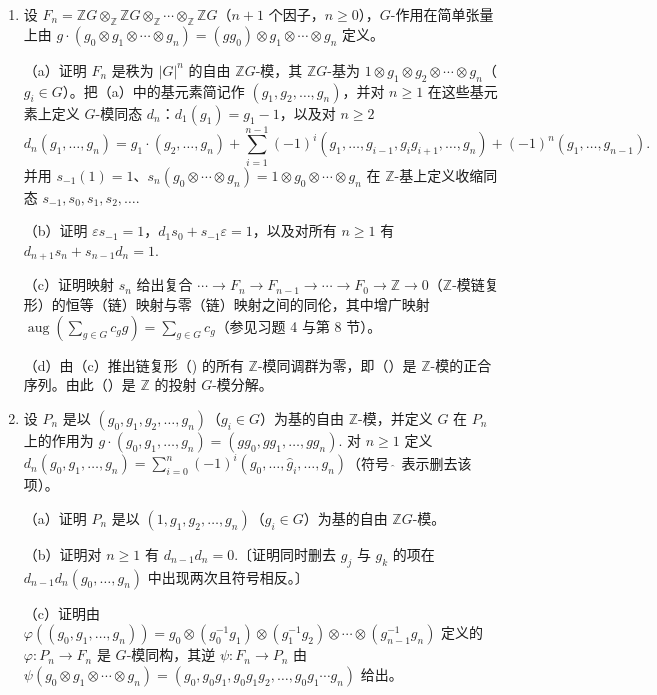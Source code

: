 \begin{enumerate}
\item 设 \(F_n = \mathbb{Z}G \otimes_{\mathbb{Z}}\mathbb{Z}G \otimes_{\mathbb{Z}}\cdots \otimes_{\mathbb{Z}}\mathbb{Z}G\)（\(n+1\) 个因子，\(n \geq 0\)），\(G\)-作用在简单张量上由 \(g \cdot (g_0 \otimes g_1 \otimes \cdots \otimes g_n) = (gg_0) \otimes g_1 \otimes \cdots \otimes g_n\) 定义。

（a）证明 \(F_n\) 是秩为 \(|G|^n\) 的自由 \(\mathbb{Z}G\)-模，其 \(\mathbb{Z}G\)-基为 \(1 \otimes g_1 \otimes g_2 \otimes \cdots \otimes g_n\)（\(g_i \in G\)）。把（a）中的基元素简记作 \((g_1, g_2, \ldots, g_n)\)，并对 \(n \geq 1\) 在这些基元素上定义 \(G\)-模同态 \(d_n\)：\(d_1(g_1) = g_1-1\)，以及对 \(n \geq 2\)
\[
d_n(g_1, \ldots, g_n) = g_1 \cdot (g_2, \ldots, g_n)+\sum_{i=1}^{n-1}(-1)^i(g_1, \ldots, g_{i-1}, g_ig_{i+1}, \ldots, g_n)+(-1)^n(g_1, \ldots, g_{n-1}).
\]
并用 \(s_{-1}(1) = 1\)、\(s_n(g_0 \otimes \cdots \otimes g_n) = 1 \otimes g_0 \otimes \cdots \otimes g_n\) 在 \(\mathbb{Z}\)-基上定义收缩同态 \(s_{-1}, s_0, s_1, s_2, \ldots\).

（b）证明 \(\varepsilon s_{-1} = 1\)，\(d_1s_0+s_{-1}\varepsilon = 1\)，以及对所有 \(n \geq 1\) 有 \(d_{n+1}s_n+s_{n-1}d_n = 1\).

（c）证明映射 \(s_n\) 给出复合 \(\cdots \to F_n \to F_{n-1} \to \cdots \to F_0 \to \mathbb{Z} \to 0\)（\(\mathbb{Z}\)-模链复形）的恒等（链）映射与零（链）映射之间的同伦，其中增广映射 \(\operatorname{aug}(\sum_{g \in G}c_gg) = \sum_{g \in G}c_g\)（参见习题 4 与第 8 节）。

（d）由（c）推出链复形（\*) 的所有 \(\mathbb{Z}\)-模同调群为零，即（\*）是 \(\mathbb{Z}\)-模的正合序列。由此（\*）是 \(\mathbb{Z}\) 的投射 \(G\)-模分解。

\item 设 \(P_n\) 是以 \((g_0, g_1, g_2, \ldots, g_n)\)（\(g_i \in G\)）为基的自由 \(\mathbb{Z}\)-模，并定义 \(G\) 在 \(P_n\) 上的作用为 \(g \cdot (g_0, g_1, \ldots, g_n) = (gg_0, gg_1, \ldots, gg_n)\). 对 \(n \geq 1\) 定义 \(d_n(g_0, g_1, \ldots, g_n) = \sum_{i=0}^{n}(-1)^i(g_0, \ldots, \hat g_i, \ldots, g_n)\)（符号 \(\hat{\ }\) 表示删去该项）。

（a）证明 \(P_n\) 是以 \((1, g_1, g_2, \ldots, g_n)\)（\(g_i \in G\)）为基的自由 \(\mathbb{Z}G\)-模。

（b）证明对 \(n \geq 1\) 有 \(d_{n-1}d_n = 0\).〔证明同时删去 \(g_j\) 与 \(g_k\) 的项在 \(d_{n-1}d_n(g_0, \ldots, g_n)\) 中出现两次且符号相反。〕

（c）证明由 \(\varphi((g_0, g_1, \ldots, g_n)) = g_0 \otimes (g_0^{-1}g_1) \otimes (g_1^{-1}g_2) \otimes \cdots \otimes (g_{n-1}^{-1}g_n)\) 定义的 \(\varphi : P_n \to F_n\) 是 \(G\)-模同构，其逆 \(\psi : F_n \to P_n\) 由 \(\psi(g_0 \otimes g_1 \otimes \cdots \otimes g_n) = (g_0, g_0g_1, g_0g_1g_2, \ldots, g_0g_1\cdots g_n)\) 给出。


\end{enumerate}
